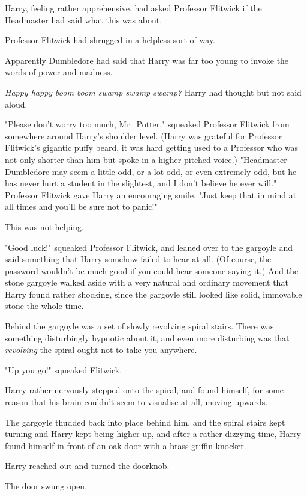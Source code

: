 Harry, feeling rather apprehensive, had asked Professor Flitwick if the 
Headmaster had said what this was about.

Professor Flitwick had shrugged in a helpless sort of way.

Apparently Dumbledore had said that Harry was far too young to invoke the words 
of power and madness.

\emph{Happy happy boom boom swamp swamp swamp?} Harry had thought but not said 
aloud.

"Please don't worry too much, Mr.~Potter," squeaked Professor Flitwick from 
somewhere around Harry's shoulder level. (Harry was grateful for Professor 
Flitwick's gigantic puffy beard, it was hard getting used to a Professor who 
was not only shorter than him but spoke in a higher-pitched voice.) "Headmaster 
Dumbledore may seem a little odd, or a lot odd, or even extremely odd, but he 
has never hurt a student in the slightest, and I don't believe he ever will." 
Professor Flitwick gave Harry an encouraging smile. "Just keep that in mind at 
all times and you'll be sure not to panic!"

This was not helping.

"Good luck!" squeaked Professor Flitwick, and leaned over to the gargoyle and 
said something that Harry somehow failed to hear at all. (Of course, the 
password wouldn't be much good if you could hear someone saying it.) And the 
stone gargoyle walked aside with a very natural and ordinary movement that 
Harry found rather shocking, since the gargoyle still looked like solid, 
immovable stone the whole time.

Behind the gargoyle was a set of slowly revolving spiral stairs. There was 
something disturbingly hypnotic about it, and even more disturbing was that 
\emph{revolving} the spiral ought not to take you anywhere.

"Up you go!" squeaked Flitwick.

Harry rather nervously stepped onto the spiral, and found himself, for some 
reason that his brain couldn't seem to visualise at all, moving upwards.

The gargoyle thudded back into place behind him, and the spiral stairs kept 
turning and Harry kept being higher up, and after a rather dizzying time, Harry 
found himself in front of an oak door with a brass griffin knocker.

Harry reached out and turned the doorknob.

The door swung open.

